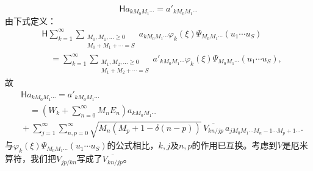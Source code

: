 \documentclass[fontsize=13pt,twoside,openany,headings=normal,parskip=false,bookmarkpackage=false,DIV=calc]{scrbook}
\begin{document}
\[
 \mathsf{H}a_{kM_0M_1\cdots}=a'_{kM_0M_1\cdots}
\]
由下式定义：
\begin{align*}
 &\mathsf{H}\sum_{k=1}^{\infty}\sum_{\substack{M_0,M_1,\ldots\ge0\\M_0+M_1+\cdots=S}}
 a_{kM_0M_1\cdots}\varphi_k(\xi)\Psi_{M_0M_1\cdots}(u_1\cdots u_S)\\
 &\quad=\sum_{k=1}^{\infty}\sum_{\substack{M_1,M_2,\ldots\ge0\\M_1+M_2+\cdots=S}}
 a'_{kM_0M_1\cdots}\varphi_k(\xi)\Psi_{M_0M_1\cdots}(u_1\cdots u_S),
\end{align*}
故
\begin{align*}
 &\mathsf{H}a_{kM_0M_1\cdots}=a'_{kM_0M_1\cdots}\\
 &\quad={}\left(W_k+\sum_{n=0}^{\infty}M_nE_n\right)a_{kM_0M_1\cdots}\\
 &{}+\sum_{j=1}^{\infty}\sum_{n,p=0}^{\infty}\sqrt{M_n(M_p+1-\delta(n-p))}\,
 \overline{V_{kn/jp}}\,a_{jM_0M_1\cdots M_n-1\cdots M_p+1\cdots}.
\end{align*}
与$\varphi_k(\xi)\Psi_{M_0M_1\cdots}(u_1\cdots u_S)$的公式相比，$k,\allowbreak j$及$n,\allowbreak p$的作用已互换。考虑到$V$是厄米算符，我们把$V_{jp/kn}$写成了$\overline{V_{kn/jp}}$。
\end{document}
